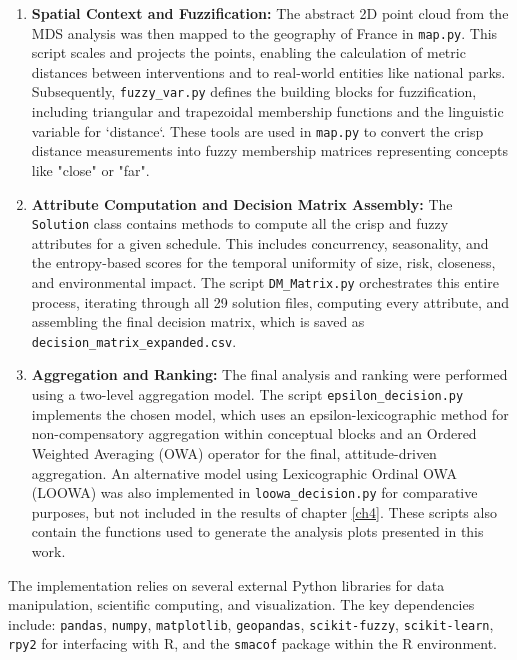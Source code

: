 \begin{enumerate}
    \item \textbf{Spatial Context and Fuzzification:} The abstract 2D point cloud from the MDS analysis was then mapped to the geography of France in \texttt{map.py}. This script scales and projects the points, enabling the calculation of metric distances between interventions and to real-world entities like national parks. Subsequently, \texttt{fuzzy\_var.py} defines the building blocks for fuzzification, including triangular and trapezoidal membership functions and the linguistic variable for `distance`. These tools are used in \texttt{map.py} to convert the crisp distance measurements into fuzzy membership matrices representing concepts like "close" or "far".

    \item \textbf{Attribute Computation and Decision Matrix Assembly:} The \texttt{Solution} class contains methods to compute all the crisp and fuzzy attributes for a given schedule. This includes concurrency, seasonality, and the entropy-based scores for the temporal uniformity of size, risk, closeness, and environmental impact. The script \texttt{DM\_Matrix.py} orchestrates this entire process, iterating through all 29 solution files, computing every attribute, and assembling the final decision matrix, which is saved as \texttt{decision\_matrix\_expanded.csv}.

    \item \textbf{Aggregation and Ranking:} The final analysis and ranking were performed using a two-level aggregation model. The script \texttt{epsilon\_decision.py} implements the chosen model, which uses an epsilon-lexicographic method for non-compensatory aggregation within conceptual blocks and an Ordered Weighted Averaging (OWA) operator for the final, attitude-driven aggregation. An alternative model using Lexicographic Ordinal OWA (LOOWA) was also implemented in \texttt{loowa\_decision.py} for comparative purposes, but not included in the results of chapter \ref{ch4}. These scripts also contain the functions used to generate the analysis plots presented in this work.
\end{enumerate}

The implementation relies on several external Python libraries for data manipulation, scientific computing, and visualization. The key dependencies include: \texttt{pandas}, \texttt{numpy}, \texttt{matplotlib}, \texttt{geopandas}, \texttt{scikit-fuzzy}, \texttt{scikit-learn}, \texttt{rpy2} for interfacing with R, and the \texttt{smacof} package within the R environment.

